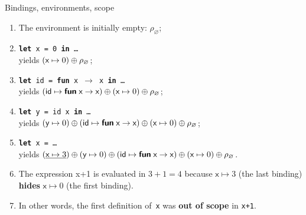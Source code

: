 \documentclass[compress,dvipdfmx]{beamer}
\begin{document}
%
\begin{frame}{Bindings, environments, scope}

  \begin{enumerate}

    \item The environment is initially empty: \(\rho_\varnothing\);

    \item \texttt{\small \textbf{let} x = 0 \textbf{in}
      \ldots}\\ yields $(\textsf{x} \mapsto 0) \oplus
      \rho_\varnothing$;

    \item \texttt{\small \textbf{let} id = \textbf{fun} x
      $\rightarrow$ x \textbf{in} \ldots}\\ yields $(\textsf{id}
      \mapsto \textsf{\textbf{fun}} \; \textsf{x} \rightarrow \textsf{x}) \oplus
      (\textsf{x} \mapsto 0) \oplus \rho_\varnothing$;

    \item \texttt{\small \textbf{let} y = id x \textbf{in}
      \ldots}\\ yields $(\textsf{y} \mapsto 0) \oplus (\textsf{id}
      \mapsto \textsf{\textbf{fun}} \; \textsf{x} \rightarrow \textsf{x}) \oplus
      (\textsf{x} \mapsto 0) \oplus \rho_\varnothing$;

    \item \texttt{\small \textbf{let} x = \ldots}\\ yields
      $(\underline{\textsf{x} \mapsto 3}) \oplus (\textsf{y}
      \mapsto 0) \oplus (\textsf{id} \mapsto \textsf{\textbf{fun}} \;
      \textsf{x} \rightarrow \textsf{x}) \oplus (\textsf{x} \mapsto
      0) \oplus \rho_\varnothing$.

    \item The expression \textsf{\small x+1} is evaluated in \(3+1=4\)
      because \(\textsf{x} \mapsto 3\) (the last binding)
      \textbf{hides} \(\textsf{x} \mapsto 0\) (the first
      binding).

    \item In other words, the first definition of~\texttt{\small x} was
      \textbf{out of scope} in \texttt{\small x+1}.

  \end{enumerate}

\end{frame}
\end{document}
